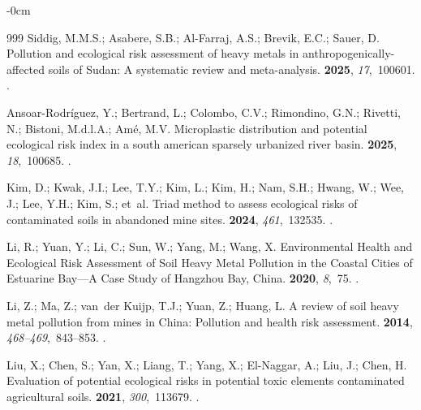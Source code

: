 \documentclass[environremediat,article,accept,pdftex,oneauthor]{Definitions/mdpi}
\begin{document}
\begin{adjustwidth}{-\extralength}{0cm}
\begin{thebibliography}{999}
Siddig, M.M.S.; Asabere, S.B.; Al-Farraj, A.S.; Brevik, E.C.; Sauer, D.
\newblock Pollution and ecological risk assessment of heavy metals in
  anthropogenically-affected soils of Sudan: A systematic review and
  meta-analysis.
 {\bf 2025}, {\em
  17},~100601.
.

Ansoar-Rodr{\'i}guez, Y.; Bertrand, L.; Colombo, C.V.; Rimondino, G.N.;
  Rivetti, N.; Bistoni, M.d.l.A.; Am{\'e}, M.V.
\newblock Microplastic distribution and potential ecological risk index in a
  south american sparsely urbanized river basin.
 {\bf 2025}, {\em
  18},~100685.
.

Kim, D.; Kwak, J.I.; Lee, T.Y.; Kim, L.; Kim, H.; Nam, S.H.; Hwang, W.; Wee, J.; Lee, Y.H.; Kim, S.; et~al.
\newblock Triad method to assess ecological risks of contaminated soils in
  abandoned mine sites.
 {\bf 2024}, {\em 461},~132535.
.

Li, R.; Yuan, Y.; Li, C.; Sun, W.; Yang, M.; Wang, X.
\newblock Environmental Health and Ecological Risk Assessment of Soil Heavy
  Metal Pollution in the Coastal Cities of Estuarine Bay—A Case Study of
  Hangzhou Bay, China.
 {\bf 2020}, {\em 8},~75.
.

Li, Z.; Ma, Z.; van~der Kuijp, T.J.; Yuan, Z.; Huang, L.
\newblock A review of soil heavy metal pollution from mines in China: Pollution
  and health risk assessment.
 {\bf 2014}, {\em
  468--469},~843--853.
.

Liu, X.; Chen, S.; Yan, X.; Liang, T.; Yang, X.; El-Naggar, A.; Liu, J.; Chen, H.
\newblock Evaluation of potential ecological risks in potential toxic elements
  contaminated agricultural soils.
 {\bf 2021}, {\em
  300},~113679.
.


\end{thebibliography}
\end{adjustwidth}
\end{document}
